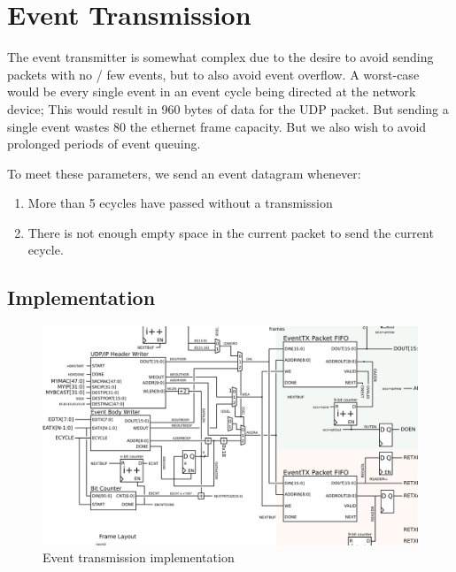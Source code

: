 \section{Event Transmission}

The event transmitter is somewhat complex due to the desire to avoid
sending packets with no / few events, but to also avoid event
overflow. A worst-case would be every single event in an event cycle
being directed at the network device; This would result in 960 bytes
of data for the UDP packet. But sending a single event wastes 80%
the ethernet frame capacity. But we also wish to avoid prolonged
periods of event queuing.

To meet these parameters, we send an event datagram whenever: 
\begin{enumerate}
\item More than 5 ecycles have passed without a transmission
\item There is not enough empty space in the current packet to send the current ecycle. 
\end{enumerate} 

\subsection{Implementation}
\begin{figure}
\begin{centering}
\includegraphics[scale=0.8]{eventtx.svg}
\end{centering}
\caption{Event transmission implementation}
\label{eventtx}
\end{figure}

